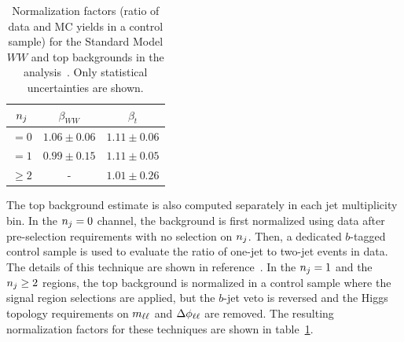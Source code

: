 \begin{table}[h!]
\centering
\captionsetup{justification=centering}

\hspace{-10pt}
\begin{tabular}{|c|c|c|}
\hline
$n_j$ & $\beta_{WW}$ & $\beta_{t}$ \\ \hline
$ = 0$ & $1.06 \pm 0.06$ & $1.11 \pm 0.06$ \\ \hline
$= 1$ & $0.99 \pm 0.15$ & $1.11 \pm 0.05$  \\ \hline
$\geq 2$ & - & $1.01 \pm 0.26$ \\ \hline
\end{tabular}

\caption{
Normalization factors (ratio of data and MC yields in a control sample) for the Standard Model $WW$ and top backgrounds in the \HWWfull analysis~\cite{Discovery}. Only statistical uncertainties are shown. 
}
\label{tab:disc_NF}
\end{table}

The top background estimate is also computed separately in each jet multiplicity bin. In the $n_j = 0$ channel, the background is first normalized using data after pre-selection requirements with no selection on $n_j$. Then, a dedicated $b$-tagged control sample is used to evaluate the ratio of one-jet to two-jet events in data. The details of this technique are shown in reference~\cite{Higgs2011}. In the $n_j = 1$ and the $n_j \geq 2$ regions, the top background is normalized in a control sample where the signal region selections are applied, but the $b$-jet veto is reversed and the Higgs topology requirements on $m_{\ell\ell}$ and $\Delta\phi_{\ell\ell}$ are removed. The resulting normalization factors for these techniques are shown in table~\ref{tab:disc_NF}. 

